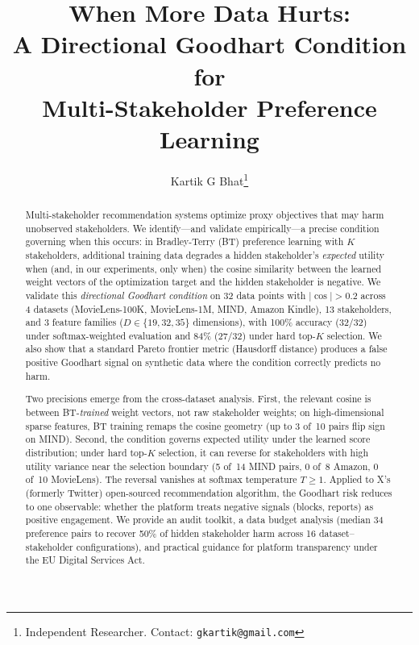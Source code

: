 \documentclass[11pt,letterpaper]{article}
\title{\textbf{When More Data Hurts:\\[2pt]
  A Directional Goodhart Condition for\\[2pt]
  Multi-Stakeholder Preference Learning}}
\author{Kartik G Bhat\thanks{Independent Researcher. Contact: \texttt{gkartik@gmail.com}}}
\date{}
\begin{document}
\maketitle

\begin{abstract}\noindent
Multi-stakeholder recommendation systems optimize proxy objectives
that may harm unobserved stakeholders. We identify---and validate
empirically---a precise condition governing when this occurs: in
Bradley-Terry (BT) preference learning with $K$ stakeholders,
additional training data degrades a hidden stakeholder's \emph{expected}
utility when (and, in our experiments, only when) the cosine
similarity between the learned weight vectors of the optimization
target and the hidden stakeholder is negative. We validate this
\emph{directional Goodhart condition} on 32 data points with
$|\cos| > 0.2$ across 4 datasets (MovieLens-100K, MovieLens-1M,
MIND, Amazon Kindle), 13 stakeholders, and 3 feature families
($D \in \{19, 32, 35\}$ dimensions), with 100\% accuracy (32/32)
under softmax-weighted evaluation and 84\% (27/32) under hard
top-$K$ selection. We also show that a standard Pareto frontier
metric (Hausdorff distance) produces a false positive Goodhart signal
on synthetic data where the condition correctly predicts no harm.

Two precisions emerge from the cross-dataset analysis. First, the
relevant cosine is between BT-\emph{trained} weight vectors, not raw
stakeholder weights; on high-dimensional sparse features, BT training
remaps the cosine geometry (up to 3 of~10 pairs flip sign on MIND).
Second, the condition governs expected utility under the learned score
distribution; under hard top-$K$ selection, it can reverse for
stakeholders with high utility variance near the selection boundary
(5 of~14 MIND pairs, 0 of~8 Amazon, 0 of~10 MovieLens). The reversal
vanishes at softmax temperature $T \geq 1$.
Applied to X's (formerly Twitter) open-sourced recommendation
algorithm, the Goodhart risk reduces to one observable: whether the
platform treats negative
signals (blocks, reports) as positive engagement. We provide an audit
toolkit, a data budget analysis (median 34 preference pairs to recover
50\% of hidden stakeholder harm across 16 dataset--stakeholder configurations),
and practical guidance for platform transparency under the EU Digital
Services Act.
\end{abstract}

\end{document}
